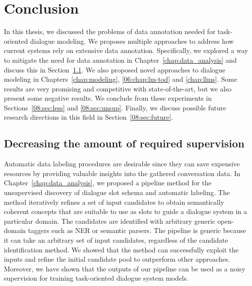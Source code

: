 \chapter{Conclusion}
\label{chap:conclusion}
In this thesis, we discussed the problems of data annotation needed for task-oriented dialogue modeling.
We proposes multiple approaches to address how current systems rely on extensive data annotation.
Specifically, we explored a way to mitigate the need for data annotation in Chapter~\ref{chap:data_analysis} and discuss this in Section~\ref{08:sec:labels}.
We also proposed novel approaches to dialogue modeling in Chapters~\ref{chap:modeling}, \ref{06:chap:lm-tod} and \ref{chap:llms}.
Some results are very promising and competitive with state-of-the-art, but we also present some negative results.
We conclude from these experiments in Sections~\ref{08:sec:less} and \ref{08:sec:unsup}.
Finally, we discuss possible future research directions in this field in Section~\ref{08:sec:future}.

\section{Decreasing the amount of required supervision}
\label{08:sec:labels}
Automatic data labeling procedures are desirable since they can save expensive resources by providing valuable insights into the gathered conversation data.
In Chapter~\ref{chap:data_analysis}, we proposed a pipeline method for the unsupervised discovery of dialogue slot schema and automatic labeling.
The method iteratively refines a set of input candidates to obtain semantically coherent concepts that are suitable to use as slots to guide a dialogue system in a particular domain.
The candidates are identified with arbitrary generic open-domain taggers such as NER or semantic parsers.
The pipeline is generic because it can take an arbitrary set of input candidates, regardless of the candidate identification method.
We showed that the method can successfully exploit the inputs and refine the initial candidate pool to outperform other approaches.
Moreover, we have shown that the outputs of our pipeline can be used as a noisy supervision for training task-oriented dialogue system models.

